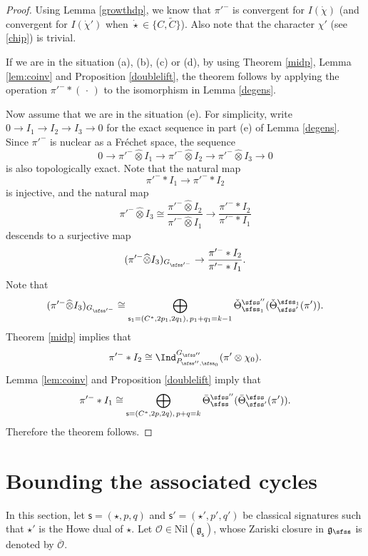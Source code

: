 \documentclass[12pt,a4paper]{amsart}
\newcommand{\CO}{{\mathcal {O}}}
\newcommand{\g}{\mathfrak g}
\numberwithin{equation}{section}
\theoremstyle{remark}
\def\Thetab{\bar{\Theta}}
\def\totimes{\widehat{\otimes}}
\begin{document}
\begin{proof}
Using Lemma \ref{growthdp}, we know that $\pi'^-$ is convergent for $I(\dot \chi)$ (and convergent for $I(\dot \chi')$ when $\dot \star\in \{C,\widetilde C\}$). Also note that the character $\chi'$ (see \eqref{chip}) is trivial.

If we are in the situation (a), (b), (c) or (d), by using Theorem \ref{midp}, Lemma \ref{lem:coinv} and Proposition \ref{doublelift}, the theorem follows by applying the operation $\pi'^-*(\,\cdot\,)$ to the isomorphism in Lemma \ref{degens}.

Now assume that we are in the situation (e).
For simplicity, write $0\rightarrow I_1\rightarrow I_2\rightarrow I_3\rightarrow
0$ for the exact sequence in part (e) of Lemma \ref{degens}. Since $\pi'^-$ is nuclear as a Fr\'echet space, the sequence
\[
0\rightarrow \pi'^-\totimes I_1\rightarrow \pi'^-\totimes I_2\rightarrow \pi'^-\totimes I_3\rightarrow
0
\]
is also topologically exact.
Note that the natural map
\[
\pi'^- * I_1\rightarrow \pi'^- * I_2
\]
is injective, and the natural map
\[
  \pi'^-\totimes I_3\cong \frac{\pi'^-\totimes I_2}{\pi'^- \totimes I_1}\longrightarrow\frac{ \pi'^-*I_2}{\pi'^-*I_1}
  \]
descends to a surjective map
\[
  (\pi'^-\totimes  I_3)_{G_{\sfss'^-}}\rightarrow \frac{ \pi'^-*I_2}{\pi'^-*I_1}.
\]
Note that
\[
   (\pi'^-\totimes  I_3)_{G_{\sfss'^-}}\cong \bigoplus_{\mathsf s_1=(C^*, 2p_1, 2q_1), \, p_1+q_1=k-1} \check \Theta^{\sfss''}_{\sfss_1}(\check \Theta^{\sfss_1}_{\sfss'}(\pi')).
\]
Theorem \ref{midp} implies that
\[
\pi'^-*I_2\cong \Ind_{P_{\sfss'',\sfss_0}}^{G_{\sfss''}} (\pi'\otimes \chi_0).
\]
Lemma \ref{lem:coinv} and Proposition \ref{doublelift} imply that
\[
\pi'^-*I_1\cong  \bigoplus_{\mathsf s=(C^*, 2p, 2q), \, p+q=k}  \Thetab^{\sfss''}_{\sfss}(\Thetab^{\sfss}_{\sfss'}(\pi')).
\]
Therefore the theorem follows.
\end{proof}





\section{Bounding the associated  cycles}\label{sec:AC}

In this section, let $\mathsf s=(\star, p,q)$ and $ \mathsf s'=(\star', p',q')$ be classical signatures such that $\star'$ is the Howe dual of $\star$.
Let $\CO\in \mathrm{Nil}(\g_\mathsf s)$, whose Zariski closure in $\g_\sfss$ is denoted by $\overline \CO$. 
\end{document}
